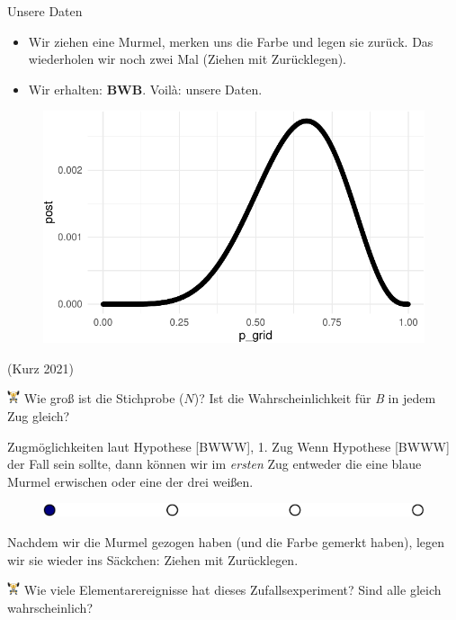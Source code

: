 \documentclass[
  ngerman,
  ignorenonframetext,
]{beamer}
\begin{document}
\begin{frame}{Unsere Daten}
\protect\hypertarget{unsere-daten}{}
\begin{itemize}
\item
  Wir ziehen eine Murmel, merken uns die Farbe und legen sie zurück. Das
  wiederholen wir noch zwei Mal (Ziehen mit Zurücklegen).
\item
  Wir erhalten: \textbf{BWB}. Voilà: unsere Daten.
\end{itemize}

\begin{figure}[H]
\includegraphics[width=0.7\linewidth]{unnamed-chunk-7-1} \end{figure}

(Kurz 2021)

\includegraphics[width=1em]{../img/weight.pdf} Wie groß ist die
Stichprobe (\(N\))? Ist die Wahrscheinlichkeit für \emph{B} in jedem Zug
gleich?
\end{frame}

\begin{frame}{Zugmöglichkeiten laut Hypothese {[}BWWW{]}, 1. Zug}
\protect\hypertarget{zugmuxf6glichkeiten-laut-hypothese-bwww-1.-zug}{}
Wenn Hypothese {[}BWWW{]} der Fall sein sollte, dann können wir im
\emph{ersten} Zug entweder die eine blaue Murmel erwischen oder eine der
drei weißen.

\begin{figure}[H]
\includegraphics[width=0.7\linewidth]{unnamed-chunk-8-1} \end{figure}

Nachdem wir die Murmel gezogen haben (und die Farbe gemerkt haben),
legen wir sie wieder ins Säckchen: Ziehen mit Zurücklegen.

\includegraphics[width=1em]{../img/weight.pdf} Wie viele
Elementarereignisse hat dieses Zufallsexperiment? Sind alle gleich
wahrscheinlich?
\end{frame}
\end{document}
